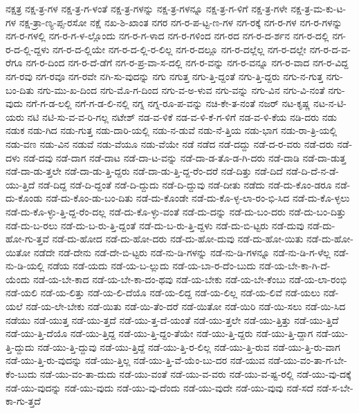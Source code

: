 {ನಕ್ಷತ್ರ
ನಕ್ಷ-ತ್ರ-ಗಳ
ನಕ್ಷ-ತ್ರ-ಗ-ಳಂತೆ
ನಕ್ಷ-ತ್ರ-ಗಳನ್ನು
ನಕ್ಷ-ತ್ರ-ಗಳನ್ನೂ
ನಕ್ಷ-ತ್ರ-ಗ-ಳಿಗೆ
ನಕ್ಷ-ತ್ರ-ಗಳೇ
ನಕ್ಷ-ತ್ರ-ಮ-ಕು-ಟ-ಗಳ
ನಕ್ಷ-ತ್ರಾ-ಣ್ಯ-ಪ್ಸ-ರಸೋ
ನಕ್ಷೆ
ನಖ-ಶಿ-ಖಾಂತ
ನಗರ
ನಗ-ರ-ಪ-ಟ್ಟ-ಣ-ಗಳ
ನಗ-ರಕ್ಕೆ
ನಗ-ರ-ಗಳ
ನಗ-ರ-ಗಳನ್ನು
ನಗ-ರ-ಗಳಲ್ಲಿ
ನಗ-ರ-ಗ-ಳ-ಲ್ಲೊಂದು
ನಗ-ರ-ಗ-ಳಾದ
ನಗ-ರ-ಗಳಿಂದ
ನಗ-ರದ
ನಗ-ರ-ದ-ರ್ಶನ
ನಗ-ರ-ದಲ್ಲಿ
ನಗ-ರ-ದ-ಲ್ಲಿ-ದ್ದಳು
ನಗ-ರ-ದ-ಲ್ಲಿಯೇ
ನಗ-ರ-ದ-ಲ್ಲಿ-ರ-ಲಿಲ್ಲ
ನಗ-ರ-ದಲ್ಲೂ
ನಗ-ರ-ದಲ್ಲೆಲ್ಲ
ನಗ-ರ-ದಲ್ಲೇ
ನಗ-ರ-ದ-ವ-ರೆಗೂ
ನಗ-ರ-ದಿಂದ
ನಗ-ರ-ದೆ-ಡೆಗೆ
ನಗ-ರ-ಪ್ರ-ವಾ-ಸ-ದಲ್ಲಿ
ನಗ-ರ-ವನ್ನು
ನಗ-ರ-ವನ್ನೂ
ನಗ-ರ-ವಾದ
ನಗ-ರ-ವಿದ್ದ
ನಗ-ರವು
ನಗ-ರವೂ
ನಗ-ರವೇ
ನಗಿ-ಸು-ವುದನ್ನು
ನಗು
ನಗುತ್ತ
ನಗು-ತ್ತಿ-ದ್ದಂತೆ
ನಗು-ತ್ತಿ-ದ್ದರು
ನಗು-ನ-ಗುತ್ತ
ನಗು-ಬಂ-ದಿತು
ನಗು-ಮು-ಖ-ದಿಂದ
ನಗು-ಮೊ-ಗ-ದಿಂದ
ನಗು-ವ-ಅ-ಳುವ
ನಗು-ವನ್ನು
ನಗು-ವಿನ
ನಗು-ವಿ-ನಂತೆ
ನಗು-ವುದು
ನಗೆ-ಗ-ಡ-ಲಲ್ಲಿ
ನಗೆ-ಗ-ಡ-ಲಿ-ನಲ್ಲಿ
ನಗ್ನ
ನಗ್ನ-ರೂ-ಪ-ವನ್ನು
ನಚಿ-ಕೇ-ತ-ನಂತೆ
ನಜರ್
ನಟ-ಕೃಷ್ಣ
ನಟ-ನ-ಟಿ-ಯರು
ನಟಿ
ನಟಿ-ಸು-ವ-ವ-ರಿ-ಗಲ್ಲ
ನಟೇಶ್
ನಡ-ವ-ಳಿಕೆ
ನಡ-ವ-ಳಿ-ಕೆ-ಗ-ಳಿಗೆ
ನಡ-ವ-ಳಿ-ಕೆಯ
ನಡಿ-ದರು
ನಡು
ನಡುಕ
ನಡು-ಗಿದ
ನಡು-ಗುತ್ತ
ನಡು-ದಾರಿ-ಯಲ್ಲಿ
ನಡು-ನ-ಡುವೆ
ನಡು-ನೆ-ತ್ತಿಯ
ನಡು-ಭಾಗ
ನಡು-ರಾ-ತ್ರಿ-ಯಲ್ಲಿ
ನಡು-ವಣ
ನಡು-ವಿನ
ನಡುವೆ
ನಡು-ವೆಯೂ
ನಡು-ವೆಯೇ
ನಡೆ
ನಡೆದ
ನಡೆ-ದದ್ದು
ನಡೆ-ದ-ರ-ವರು
ನಡೆ-ದರು
ನಡೆ-ದಳು
ನಡೆ-ದವು
ನಡೆ-ದಾಗ
ನಡೆ-ದಾಟ
ನಡೆ-ದಾ-ಟ-ವನ್ನು
ನಡೆ-ದಾ-ಡ-ತೊ-ಡ-ಗಿ-ದರು
ನಡೆ-ದಾಡಿ
ನಡೆ-ದಾ-ಡುತ್ತ
ನಡೆ-ದಾ-ಡು-ತ್ತಲೇ
ನಡೆ-ದಾ-ಡು-ತ್ತಿ-ದ್ದರು
ನಡೆ-ದಾ-ಡು-ತ್ತಿ-ದ್ದ-ರೆಂ-ದರೆ
ನಡೆ-ದಿತ್ತು
ನಡೆ-ದಿದೆ
ನಡೆ-ದಿ-ದೆ-ನ-ಡೆ-ಯು-ತ್ತಿದೆ
ನಡೆ-ದಿದ್ದ
ನಡೆ-ದಿ-ದ್ದಂತೆ
ನಡೆ-ದಿ-ದ್ದುದು
ನಡೆ-ದಿ-ದ್ದುವು
ನಡೆ-ದೀತು
ನಡೆದು
ನಡೆ-ದು-ಕೊಂ-ಡರೂ
ನಡೆ-ದು-ಕೊಂಡು
ನಡೆ-ದು-ಕೊಂ-ಡು-ಬಂ-ದಿತು
ನಡೆ-ದು-ಕೊಂಡೇ
ನಡೆ-ದು-ಕೊ-ಳ್ಳ-ಲಾ-ರಂ-ಭಿ-ಸಿದ
ನಡೆ-ದು-ಕೊ-ಳ್ಳಲು
ನಡೆ-ದು-ಕೊ-ಳ್ಳು-ತ್ತಿ-ದ್ದ-ರೆಂ-ದಲ್ಲ
ನಡೆ-ದು-ಕೊ-ಳ್ಳು-ವಂತೆ
ನಡೆ-ದು-ದನ್ನು
ನಡೆ-ದು-ಬಂ-ದರು
ನಡೆ-ದು-ಬಂ-ದಿತ್ತು
ನಡೆ-ದು-ಬ-ರಲು
ನಡೆ-ದು-ಬ-ರು-ತ್ತಿ-ದ್ದಂತೆ
ನಡೆ-ದು-ಬ-ರು-ತ್ತಿ-ದ್ದಳು
ನಡೆ-ದು-ಬಿ-ಟ್ಟರು
ನಡೆ-ದುವು
ನಡೆ-ದು-ಹೋ-ಗು-ತ್ತವೆ
ನಡೆ-ದು-ಹೋದ
ನಡೆ-ದು-ಹೋ-ದರು
ನಡೆ-ದು-ಹೋ-ದುವು
ನಡೆ-ದು-ಹೋ-ಯಿತು
ನಡೆ-ದು-ಹೋ-ಯಿತೋ
ನಡೆದೇ
ನಡೆ-ದೇನು
ನಡೆ-ದೇ-ಬಿ-ಟ್ಟರು
ನಡೆ-ನು-ಡಿ-ಗಳನ್ನು
ನಡೆ-ನು-ಡಿ-ಗಳನ್ನೂ
ನಡೆ-ನು-ಡಿ-ಗ-ಳೆಲ್ಲ
ನಡೆ-ನು-ಡಿ-ಯಲ್ಲಿ
ನಡೆಯ
ನಡೆ-ಯದು
ನಡೆ-ಯ-ಬ-ಲ್ಲುದು
ನಡೆ-ಯ-ಬಾ-ರ-ದೆಂ-ಬುದು
ನಡೆ-ಯ-ಬೇ-ಕಾ-ಗಿ-ದೆ-ಯೆಂದು
ನಡೆ-ಯ-ಬೇ-ಕಾದ
ನಡೆ-ಯ-ಬೇ-ಕಾ-ದಂ-ಥವು
ನಡೆ-ಯ-ಬೇಕು
ನಡೆ-ಯ-ಬೇ-ಕೆಂಬು
ನಡೆ-ಯ-ಲಾ-ರಂಭಿ
ನಡೆ-ಯಲಿ
ನಡೆ-ಯ-ಲಿತ್ತು
ನಡೆ-ಯ-ಲಿ-ದೆಯೊ
ನಡೆ-ಯ-ಲಿದ್ದ
ನಡೆ-ಯ-ಲಿಲ್ಲ
ನಡೆ-ಯ-ಲಿವೆ
ನಡೆ-ಯಲು
ನಡೆ-ಯಲೆ
ನಡೆ-ಯ-ಲೇ-ಬೇಕು
ನಡೆ-ಯಿತು
ನಡೆ-ಯಿ-ತೆಂ-ದರೆ
ನಡೆ-ಯಿತೋ
ನಡೆ-ಯಿರಿ
ನಡೆ-ಯಿ-ಸಲು
ನಡೆ-ಯಿ-ಸಿದ
ನಡೆಯು
ನಡೆ-ಯುತ್ತ
ನಡೆ-ಯು-ತ್ತದೆ
ನಡೆ-ಯು-ತ್ತ-ದೆ-ಯಂತೆ
ನಡೆ-ಯು-ತ್ತಲೇ
ನಡೆ-ಯು-ತ್ತಿತ್ತು
ನಡೆ-ಯು-ತ್ತಿದೆ
ನಡೆ-ಯು-ತ್ತಿ-ದೆಯೊ
ನಡೆ-ಯು-ತ್ತಿದ್ದ
ನಡೆ-ಯು-ತ್ತಿ-ದ್ದಂ-ತೆಯೇ
ನಡೆ-ಯು-ತ್ತಿ-ದ್ದರು
ನಡೆ-ಯು-ತ್ತಿ-ದ್ದಾಗ
ನಡೆ-ಯು-ತ್ತಿ-ದ್ದುದು
ನಡೆ-ಯು-ತ್ತಿ-ದ್ದುವು
ನಡೆ-ಯು-ತ್ತಿದ್ದೆ
ನಡೆ-ಯು-ತ್ತಿ-ರ-ಲಿಲ್ಲ
ನಡೆ-ಯು-ತ್ತಿ-ರುವ
ನಡೆ-ಯು-ತ್ತಿ-ರು-ವಾಗ
ನಡೆ-ಯು-ತ್ತಿ-ರು-ವುದನ್ನು
ನಡೆ-ಯು-ತ್ತಿಲ್ಲ
ನಡೆ-ಯು-ತ್ತಿ-ವೆ-ಯೆಂ-ಬು-ದರ
ನಡೆ-ಯುವ
ನಡೆ-ಯು-ವಂ-ತಾ-ಗ-ಬೇ-ಕೆಂ-ಬುದು
ನಡೆ-ಯು-ವಂ-ತಾ-ದುದು
ನಡೆ-ಯು-ವಂತೆ
ನಡೆ-ಯು-ವ-ವರು
ನಡೆ-ಯು-ವ-ಷ್ಟ-ರಲ್ಲಿ
ನಡೆ-ಯು-ವು-ದಕ್ಕೆ
ನಡೆ-ಯು-ವುದನ್ನು
ನಡೆ-ಯು-ವುದು
ನಡೆ-ಯು-ವು-ದೆಂದು
ನಡೆ-ಯು-ವುದೇ
ನಡೆ-ಯು-ವುವು
ನಡೆ-ಸದೆ
ನಡೆ-ಸ-ಬೇ-ಕಾ-ಗು-ತ್ತದೆ
}
